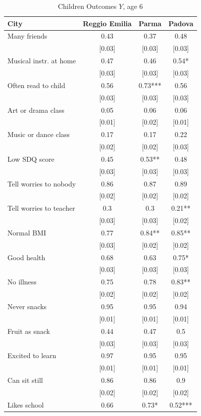 \documentclass[12pt]{article}
\begin{document}
\begin{table}[ht]
\caption{Children Outcomes $Y$, age 6}
\label{tab:childOutcomes}%
\begin{tabular}{lccc}
\hline\hline
City & Reggio Emilia & Parma & Padova \\ \hline
Many friends & 0.43 & 0.37 & 0.48 \\ 
& [0.03] & [0.03] & [0.03] \\ 
Musical instr. at home & 0.47 & 0.46 & 0.54* \\ 
& [0.03] & [0.03] & [0.03] \\ 
Often read to child & 0.56 & 0.73*** & 0.56 \\ 
& [0.03] & [0.03] & [0.03] \\ 
Art or drama class & 0.05 & 0.06 & 0.06 \\ 
& [0.01] & [0.02] & [0.01] \\ 
Music or dance class & 0.17 & 0.17 & 0.22 \\ 
& [0.02] & [0.02] & [0.03] \\ 
Low SDQ score & 0.45 & 0.53** & 0.48 \\ 
& [0.03] & [0.03] & [0.03] \\ 
Tell worries to nobody & 0.86 & 0.87 & 0.89 \\ 
& [0.02] & [0.02] & [0.02] \\ 
Tell worries to teacher & 0.3 & 0.3 & 0.21** \\ 
& [0.03] & [0.03] & [0.02] \\ 
Normal BMI & 0.77 & 0.84** & 0.85** \\ 
& [0.03] & [0.02] & [0.02] \\ 
Good health & 0.68 & 0.63 & 0.75* \\ 
& [0.03] & [0.03] & [0.03] \\ 
No illness & 0.75 & 0.78 & 0.83** \\ 
& [0.02] & [0.02] & [0.02] \\ 
Never snacks & 0.95 & 0.95 & 0.94 \\ 
& [0.01] & [0.01] & [0.01] \\ 
Fruit as snack & 0.44 & 0.47 & 0.5 \\ 
& [0.03] & [0.03] & [0.03] \\ 
Excited to learn & 0.97 & 0.95 & 0.95 \\ 
& [0.01] & [0.01] & [0.01] \\ 
Can sit still & 0.86 & 0.86 & 0.9 \\ 
& [0.02] & [0.02] & [0.02] \\ 
Likes school & 0.66 & 0.73* & 0.52*** \\ 

\end{tabular}
\end{table}
\end{document}
